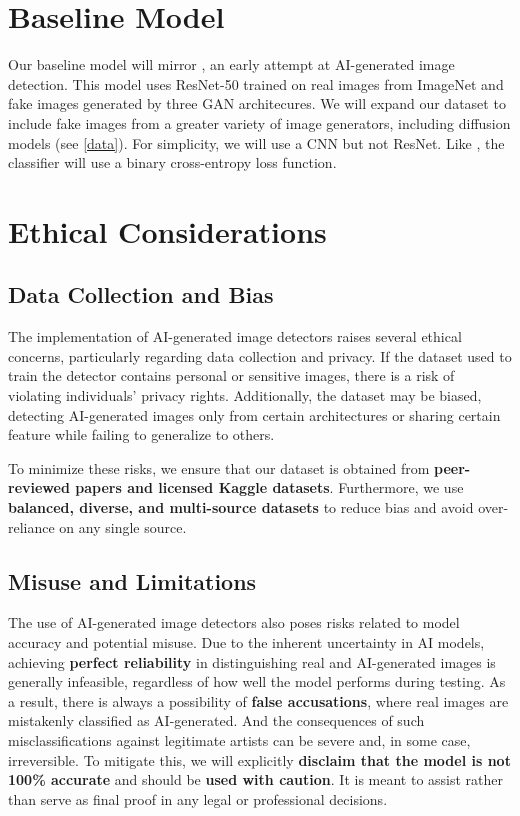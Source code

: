 \documentclass{article} %
\begin{document}
\section{Baseline Model}
\label{baseline}

Our baseline model will mirror \citet{wang2020cnngeneratedimagessurprisinglyeasy}, an early attempt at AI-generated image detection. This model uses ResNet-50 trained on real images from ImageNet and fake images generated by three GAN architecures. We will expand our dataset to include fake images from a greater variety of image generators, including diffusion models (see \ref{data}). For simplicity, we will use a CNN but not ResNet. Like \citet{wang2020cnngeneratedimagessurprisinglyeasy}, the classifier will use a binary cross-entropy loss function.

\section{Ethical Considerations}
\label{ethical}

\subsection{Data Collection and Bias}
The implementation of AI-generated image detectors raises several ethical concerns, particularly regarding data collection and privacy. If the dataset used to train the detector contains personal or sensitive images, there is a risk of violating individuals' privacy rights. Additionally, the dataset may be biased, detecting AI-generated images only from certain architectures or sharing certain feature while failing to generalize to others.

To minimize these risks, we ensure that our dataset is obtained from \textbf{peer-reviewed papers and licensed Kaggle datasets}. Furthermore, we use \textbf{balanced, diverse, and multi-source datasets} to reduce bias and avoid over-reliance on any single source.

\subsection{Misuse and Limitations}
The use of AI-generated image detectors also poses risks related to model accuracy and potential misuse. Due to the inherent uncertainty in AI models, achieving \textbf{perfect reliability} in distinguishing real and AI-generated images is generally infeasible, regardless of how well the model performs during testing. As a result, there is always a possibility of \textbf{false accusations}, where real images are mistakenly classified as AI-generated. And the consequences of such misclassifications against legitimate artists can be severe and, in some case, irreversible. To mitigate this, we will explicitly \textbf{disclaim that the model is not 100\% accurate} and should be \textbf{used with caution}. It is meant to assist rather than serve as final proof in any legal or professional decisions.
\end{document}

